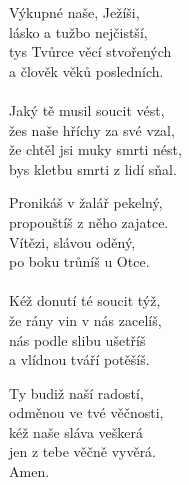 \begin{translatioMulticol}{3}
Výkupné naše, Ježíši,\\
lásko a tužbo nejčistší,\\
tys Tvůrce věcí stvořených\\
a člověk věků posledních.\\
\\
Jaký tě musil soucit vést,\\
žes naše hříchy za své vzal,\\
že chtěl jsi muky smrti nést,\\
bys kletbu smrti z lidí sňal.\columnbreak

Pronikáš v žalář pekelný,\\
propouštíš z něho zajatce.\\
Vítězi, slávou oděný,\\
po boku trůníš u Otce.\\
\\
Kéž donutí té soucit týž,\\
že rány vin v nás zacelíš,\\
nás podle slibu ušetříš\\
a vlídnou tváří potěšíš.\columnbreak

Ty budiž naší radostí,\\
odměnou ve tvé věčnosti,\\
kéž naše sláva veškerá\\
jen z tebe věčně vyvěrá.\\
Amen.
\end{translatioMulticol}
